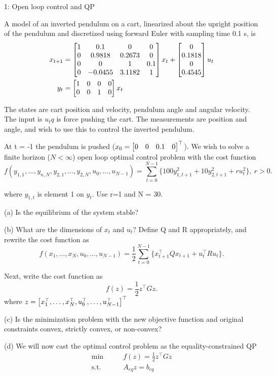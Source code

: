 
\begin{problem}{1: Open loop control and QP}

A model of an inverted pendulum on a cart, linearized about the upright position of the pendulum and discretized
using forward Euler with sampling time 0.1 s, is
\begin{align*}
  x_{t+1} & = \begin{bmatrix} 1 & 0.1 & 0 & 0 \\ 0 & 0.9818 & 0.2673 & 0 \\ 0 & 0 & 1 & 0.1 \\ 0 & -0.0455 & 3.1182 & 1 \end{bmatrix}x_t + \begin{bmatrix} 0 \\ 0.1818 \\ 0 \\ 0.4545 \end{bmatrix}u_t \\
  y_t     & = \begin{bmatrix} 1 & 0   & 0 & 0 \\ 0 & 0 & 1 & 0 \end{bmatrix}x_t
\end{align*}

The states are cart position and velocity, pendulum angle and angular velocity. The input is $u_tq$ is force pushing the cart. The measurements are position and angle, and wish to use this to control
the inverted pendulum.

\medskip
At t = -1 the pendulum is pushed ($x_0 = \begin{bmatrix} 0 & 0 & 0.1 & 0 \end{bmatrix}^{\top}$).
We wish to solve a finite horizon ($N < \infty$) open loop optimal control problem with the cost function
\[
  f(y_{1,1},\dots,y_{n,N}, y_{2, 1},\dots,y_{2,N}, u_0,\dots,u_{N-1}) = \sum_{t=0}^{N-1}\{100y_{1,t+1}^2 + 10y_{2, t+1}^2 + ru_t^2\},\ r > 0
  .\]

where $y_{1,t}$ is element 1 on $y_t$. Use r=1 and N = 30.

\medskip (a) Is the equilibrium of the system stable?

\medskip (b) What are the dimensions of $x_t$ and $u_t$? Define Q and R appropriately, and rewrite the cost function as
\[
  f(x_1,\dots,x_N, u_0,\dots,u_{N-1}) = \frac{1}{2} \sum_{t = 0}^{N-1} \{x_{t+1}^{\top}Qx_{t+1} + u_t^{\top}Ru_t\}
  .\]

Next, write the cost function as
\[
  f(z) = \frac{1}{2}z^{\top}Gz
  .\]
where $z = \begin{bmatrix} x_1^{\top},\dots,x_N^{\top},u_0^{\top},\dots,u_{N-1}^{\top} \end{bmatrix}^{\top}$

\medskip (c) Is the minimization problem with the new objective function and original constraints convex, strictly convex, or non-convex?

\medskip (d) We will now cast the optimal control problem as the equality-constrained QP
\begin{align*}
  \min\qquad        & f(z) = \frac{1}{2} z^{\top}Gz \\
  \text{s.t.}\qquad & A_{eq}z = b_{eq}
\end{align*}


\end{problem}
